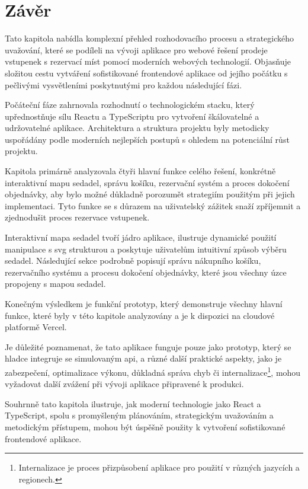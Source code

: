 \section{Závěr}
\label{sec:implementace-zaver}
Tato kapitola nabídla komplexní přehled rozhodovacího procesu a strategického uvažování, které se podíleli na vývoji aplikace pro webové řešení prodeje vstupenek s rezervací míst pomocí moderních webových technologií.
Objasňuje složitou cestu vytváření sofistikované frontendové aplikace od jejího počátku s pečlivými vysvětleními poskytnutými pro každou následující fázi.

Počáteční fáze zahrnovala rozhodnutí o technologickém stacku, který upřednostňuje sílu Reactu a TypeScriptu pro vytvoření škálovatelné a udržovatelné aplikace.
Architektura a struktura projektu byly metodicky uspořádány podle moderních nejlepších postupů s ohledem na potenciální růst projektu.

Kapitola primárně analyzovala čtyři hlavní funkce celého řešení, konkrétně interaktivní mapu sedadel, správu košíku, rezervační systém a proces dokočení objednávky, aby bylo možné důkladně porozumět strategiím použitým při jejich implementaci.
Tyto funkce se s důrazem na uživatelský zážitek snaží zpříjemnit a zjednodušit proces rezervace vstupenek.

Interaktivní mapa sedadel tvoří jádro aplikace, ilustruje dynamické použití manipulace s \ac{svg} strukturou a poskytuje uživatelům intuitivní způsob výběru sedadel.
Následující sekce podrobně popisují správu nákupního košíku, rezervačního systému a procesu dokočení objednávky, které jsou všechny úzce propojeny s mapou sedadel.

Konečným výsledkem je funkční prototyp, který demonstruje všechny hlavní funkce, které byly v této kapitole analyzovány a je k dispozici na cloudové platformě Vercel.

Je důležité poznamenat, že tato aplikace funguje pouze jako prototyp, který se hladce integruje se simulovaným \ac{api}, a různé další praktické aspekty, jako je zabezpečení, optimalizace výkonu, důkladná správa chyb či internalizace\footnote{Internalizace je proces přizpůsobení aplikace pro použití v různých jazycích a regionech.}, mohou vyžadovat další zvážení při vývoji aplikace připravené k produkci.

Souhrnně tato kapitola ilustruje, jak moderní technologie jako React a TypeScript, spolu s promyšleným plánováním, strategickým uvažováním a metodickým přístupem, mohou být úspěšně použity k vytvoření sofistikované frontendové aplikace.

